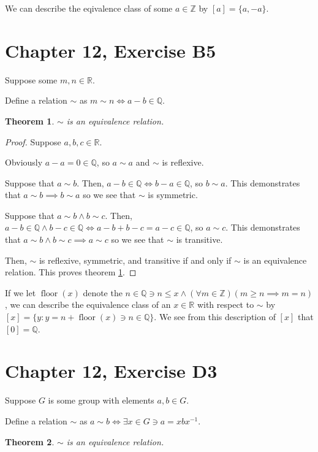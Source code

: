 \documentclass[12pt]{article}
\newcommand{\reals}{\mathbb{R}}
\newcommand{\rats}{\mathbb{Q}}
\newcommand{\ints}{\mathbb{Z}}
\newtheorem{thm}{Theorem}
\begin{document}
We can describe the eqivalence class of some $a \in \ints$
by $[a] = \{a, -a\}$.

\section{Chapter 12, Exercise B5}

Suppose some $m,n \in \reals$.

Define a relation $\sim$ as $m \sim n \iff a - b \in \rats$.

\begin{thm} \label{thm10}
	$\sim$ is an equivalence relation.
\end{thm}

\begin{proof}
	Suppose $a,b,c \in \reals$.

	Obviously $a - a = 0 \in \rats$,
	so $a \sim a$
	and $\sim$ is reflexive.

	Suppose that $a \sim b$.
	Then, $a - b \in \rats \iff b - a \in \rats$,
	so $b \sim a$.
	This demonstrates that $a \sim b \implies b \sim a$
	so we see that $\sim$ is symmetric.

	Suppose that $a \sim b \land b \sim c$.
	Then, $a - b \in \rats \land b - c \in \rats \iff a - b + b - c = a - c \in \rats$,
	so $a \sim c$.
	This demonstrates that $a \sim b \land b \sim c \implies a \sim c$
	so we see that $\sim$ is transitive.

	Then,
	$\sim$ is
	reflexive,
	symmetric,
	and transitive
	if and only if
	$\sim$ is an equivalence relation.
	This proves theorem \ref{thm10}.
\end{proof}

If we let $\operatorname{floor}(x)$ denote the
$n \in \rats \ni n \le x \land (\forall m \in \ints)(m \geq n \implies m = n)$,
we can describe the equivalence class of an $x \in \reals$
with respect to $\sim$ by $[x] = \{y: y = n + \operatorname{floor}(x) \ni n \in \rats \}$.
We see from this description of $[x]$ that $[0] = \rats$.

\section{Chapter 12, Exercise D3}

Suppose $G$ is some group with elements $a,b \in G$.

Define a relation $\sim$ as $a \sim b \iff \exists x \in G \ni a = xbx^{-1}$.

\begin{thm} \label{thm11}
	$\sim$ is an equivalence relation.
\end{thm}
\end{document}
